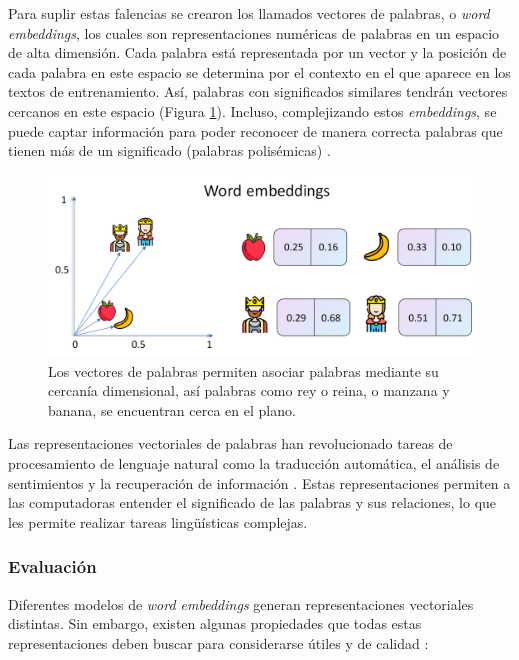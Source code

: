 Para suplir estas falencias se crearon los llamados vectores de palabras, o \textit{word embeddings}, los cuales son representaciones numéricas de palabras en un espacio de alta dimensión. Cada palabra está representada por un vector y la posición de cada palabra en este espacio se determina por el contexto en el que aparece en los textos de entrenamiento. Así, palabras con significados similares tendrán vectores cercanos en este espacio (Figura \ref{fig:word_embbeding}). Incluso, complejizando estos \textit{embeddings}, se puede captar información para poder reconocer de manera correcta palabras que tienen más de un significado (palabras polisémicas) \parencite{liu2020surveycontextualembeddings}.

\begin{figure}[H]
    \centering
    \includegraphics[width=1\textwidth]{imagenes/word_embeddings.png}
    \caption{Los vectores de palabras permiten asociar palabras mediante su cercanía dimensional, así palabras como rey o reina, o manzana y banana, se encuentran cerca en el plano.}
    \label{fig:word_embbeding}
\end{figure}

Las representaciones vectoriales de palabras han revolucionado tareas de procesamiento de lenguaje natural como la traducción automática, el análisis de sentimientos y la recuperación de información \parencite{sentimentanalysisspanishtweets}. Estas representaciones permiten a las computadoras entender el significado de las palabras y sus relaciones, lo que les permite realizar tareas lingüísticas complejas.

\subsubsection{Evaluación}

Diferentes modelos de \textit{word embeddings} generan representaciones vectoriales distintas. Sin embargo, existen algunas propiedades que todas estas representaciones deben buscar para considerarse útiles y de calidad \parencite{Wang_2019}:

